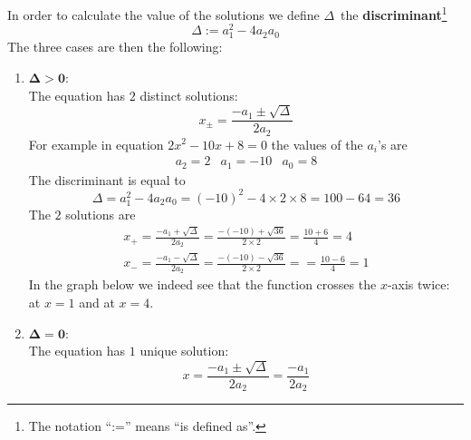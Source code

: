 \noindent In order to calculate the value of the solutions we define $\Delta$\, the \textbf{discriminant}\footnote{The notation "`:="' means "`is defined as"'.}
$$
\Delta := a_1^2 - 4 a_2 a_0
$$ 
The three cases are then the following:
\begin{enumerate}
\item $\mathbf{\Delta > 0:}$\\
\noindent The equation has $2$ distinct solutions:
$$
x_{\pm} = \frac{- a_1 \pm \sqrt{\Delta}}{2 a_2}
$$
\noindent For example in equation $2x^2 -10 x +8 = 0$ the values of the $a_i$'s are
\begin{eqnarray*}
a_2 = 2 & a_1 = -10 & a_0 = 8
\end{eqnarray*}
The discriminant is equal to
$$
\Delta = a_1^2 - 4 a_2 a_0 = (-10)^2 - 4\times 2 \times 8 = 100 - 64 = 36
$$
The $2$ solutions are
\begin{eqnarray*}
x_+ = \frac{-a_1 + \sqrt{\Delta}}{2 a_2} = \frac{-(-10) + \sqrt{36}}{2 \times 2} =  \frac{10 + 6}{4} = 4 \\
x_- = \frac{-a_1 - \sqrt{\Delta}}{2 a_2} = \frac{-(-10) - \sqrt{36}}{2 \times 2} =  = \frac{10 - 6}{4} = 1 
\end{eqnarray*}
\noindent In the graph below we indeed see that the function crosses the $x$-axis twice: at $x=1$ and at $x=4$.
\begin{center}
\end{center}
\item $\mathbf{\Delta = 0:}$\\
\noindent The equation has $1$ unique solution:
$$
x =\frac{- a_1 \pm \sqrt{\Delta}}{2 a_2}=  \frac{-a_1}{2a_2}
$$


\end{enumerate}
